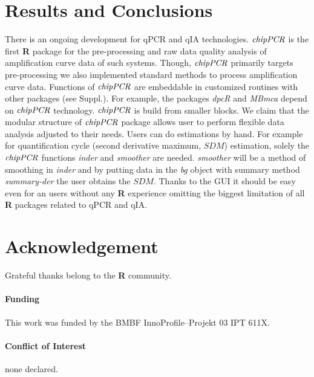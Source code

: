\documentclass{bioinfo}
\begin{document}
\section{Results and Conclusions}

There is an ongoing development for qPCR and qIA technologies. $\emph{chipPCR}$ 
is the first \textbf{R} package for the pre-processing and raw data quality 
analysis of amplification curve data of such systems. Though, $\emph{chipPCR}$ 
primarily targets pre-processing we also implemented standard methods to process 
amplification curve data. Functions of $\emph{chipPCR}$ are embeddable in 
customized routines with other packages (see Suppl.). For example, the packages 
\emph{dpcR} and \emph{MBmca} depend on $\emph{chipPCR}$ technology. 
$\emph{chipPCR}$ is build from smaller blocks. We claim that the modular 
structure of $\emph{chipPCR}$ package allows user to perform flexible data 
analysis adjusted to their needs. Users can do estimations by hand. For example 
for quantification cycle (second derivative maximum, $SDM$) estimation, solely 
the $\emph{chipPCR}$ functions \textsl{inder} and \textsl{smoother} are needed. 
\textsl{smoother} will be a method of smoothing in \textsl{inder} and by putting 
data in the \textsl{bg} object with summary method \textsl{summary-der} the user 
obtains the $SDM$. Thanks to the GUI it should be easy even for an users without 
any \textbf{R} experience omitting the biggest limitation of all \textbf{R} 
packages related to qPCR and qIA.


\section*{Acknowledgement}
Grateful thanks belong to the \textbf{R} community.

\paragraph{Funding\textcolon} This work was funded by the BMBF InnoProfile--Projekt 03 IPT 611X.

\paragraph{Conflict of Interest\textcolon} none declared.



%
%
%
%
%
%
%

\end{document}
